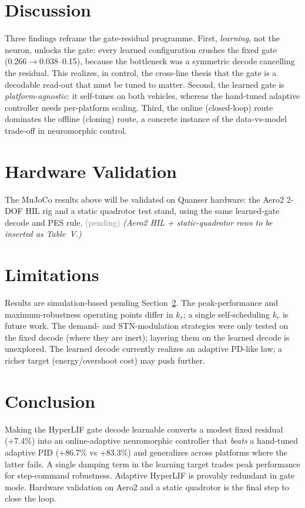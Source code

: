 \documentclass[conference]{IEEEtran}
\newcommand{\pending}{\textcolor{gray}{(pending)}}
\begin{document}
\section{Discussion}
Three findings reframe the gate-residual programme. First, \emph{learning}, not
the neuron, unlocks the gate: every learned configuration crushes the fixed gate
(0.266$\rightarrow$0.038--0.15), because the bottleneck was a symmetric decode
cancelling the residual. This realizes, in control, the cross-line thesis that
the gate is a decodable read-out that must be tuned to matter. Second, the
learned gate is \emph{platform-agnostic}: it self-tunes on both vehicles, whereas
the hand-tuned adaptive controller needs per-platform scaling. Third, the online
(closed-loop) route dominates the offline (cloning) route, a concrete instance of
the data-vs-model trade-off in neuromorphic control.

\section{Hardware Validation}\label{sec:hw}
The MuJoCo results above will be validated on Quanser hardware: the Aero2 2-DOF
HIL rig and a static quadrotor test stand, using the same learned-gate decode and
PES rule. \pending{} \emph{(Aero2 HIL + static-quadrotor rows to be inserted as
Table~V.)}

\section{Limitations}
Results are simulation-based pending Section~\ref{sec:hw}. The peak-performance and
maximum-robustness operating points differ in $k_r$; a single self-scheduling
$k_r$ is future work. The demand- and STN-modulation strategies were only tested
on the fixed decode (where they are inert); layering them on the learned decode
is unexplored. The learned decode currently realizes an adaptive PD-like law; a
richer target (energy/overshoot cost) may push further.

\section{Conclusion}
Making the HyperLIF gate decode learnable converts a modest fixed residual
(+7.4\%) into an online-adaptive neuromorphic controller that \emph{beats} a
hand-tuned adaptive PID (+86.7\% vs +83.3\%) and generalizes across platforms
where the latter fails. A single damping term in the learning target trades peak
performance for step-command robustness. Adaptive HyperLIF is provably redundant
in gate mode. Hardware validation on Aero2 and a static quadrotor is the final
step to close the loop.



\end{document}
